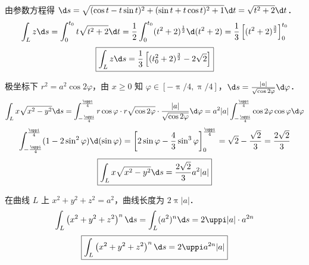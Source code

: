 \begin{solution}

    由参数方程得 $\d s = \sqrt{(\cos t - t \sin t)^{2} + (\sin t + t \cos t)^{2} + 1} \d t = \sqrt{t^{2}+2} \d t$．
    \begin{equation}
        \int_{L} z \d s = \int_{0}^{t_{0}} t \sqrt{t^{2}+2} \d t = \frac{1}{2} \int_{0}^{t_{0}} (t^{2}+2)^{\frac{1}{2}} \d(t^{2}+2) = \frac{1}{3} \left[ (t^{2}+2)^{\frac{3}{2}} \right]_{0}^{t_{0}}
    \end{equation}
    \begin{equation}
        \boxed{\int_{L} z \d s = \frac{1}{3} \left[ (t_{0}^{2}+2)^{\frac{3}{2}} - 2 \sqrt{2} \right]}
    \end{equation}


    极坐标下 $r^{2} = a^{2} \cos 2 \varphi$，由 $x \ge 0$ 知 $\varphi \in [-\uppi/4, \uppi/4]$，$\d s = \frac{|a|}{\sqrt{\cos 2 \varphi}} \d \varphi$．
    \begin{equation}
        \int_{L} x \sqrt{x^{2}-y^{2}} \d s = \int_{-\frac{\uppi}{4}}^{\frac{\uppi}{4}} r \cos \varphi \cdot r \sqrt{\cos 2 \varphi} \cdot \frac{|a|}{\sqrt{\cos 2 \varphi}} \d \varphi = a^{2} |a| \int_{-\frac{\uppi}{4}}^{\frac{\uppi}{4}} \cos 2 \varphi \cos \varphi \d \varphi
    \end{equation}
    \begin{equation}
        \int_{-\frac{\uppi}{4}}^{\frac{\uppi}{4}} (1-2\sin^{2} \varphi) \d (\sin \varphi) = \left[ 2 \sin \varphi - \frac{4}{3} \sin^{3} \varphi \right]_{0}^{\frac{\uppi}{4}} = \sqrt{2} - \frac{\sqrt{2}}{3} = \frac{2\sqrt{2}}{3}
    \end{equation}
    \begin{equation}
        \boxed{\int_{L} x \sqrt{x^{2}-y^{2}} \d s = \frac{2 \sqrt{2}}{3} a^{2} |a|}
    \end{equation}


    在曲线 $L$ 上 $x^{2}+y^{2}+z^{2} = a^{2}$，曲线长度为 $2 \uppi |a|$．
    \begin{equation}
        \int_{L}\left(x^{2}+y^{2}+z^{2}\right)^{n} \d s = \int_{L}(a^{2})^{n} \d s = 2 \uppi |a| \cdot a^{2n}
    \end{equation}
    \begin{equation}
        \boxed{\int_{L}\left(x^{2}+y^{2}+z^{2}\right)^{n} \d s = 2 \uppi a^{2n} |a|}
    \end{equation}



\end{solution}
